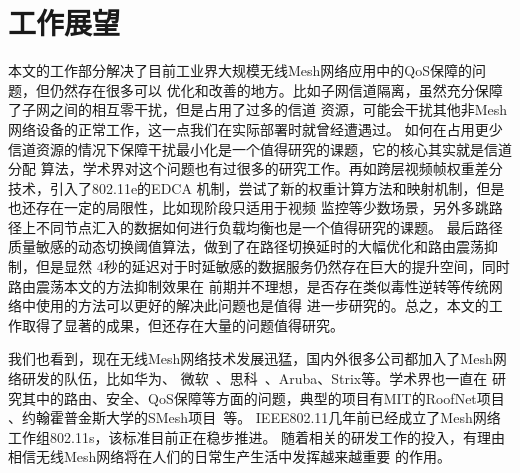 \section{工作展望}
本文的工作部分解决了目前工业界大规模无线Mesh网络应用中的QoS保障的问题，但仍然存在很多可以
优化和改善的地方。比如子网信道隔离，虽然充分保障了子网之间的相互零干扰，但是占用了过多的信道
资源，可能会干扰其他非Mesh网络设备的正常工作，这一点我们在实际部署时就曾经遭遇过。
如何在占用更少信道资源的情况下保障干扰最小化是一个值得研究的课题，它的核心其实就是信道分配
算法，学术界对这个问题也有过很多的研究工作。再如跨层视频帧权重差分技术，引入了802.11e的EDCA
机制，尝试了新的权重计算方法和映射机制，但是也还存在一定的局限性，比如现阶段只适用于视频
监控等少数场景，另外多跳路径上不同节点汇入的数据如何进行负载均衡也是一个值得研究的课题。
最后路径质量敏感的动态切换阈值算法，做到了在路径切换延时的大幅优化和路由震荡抑制，但是显然
4秒的延迟对于时延敏感的数据服务仍然存在巨大的提升空间，同时路由震荡本文的方法抑制效果在
前期并不理想，是否存在类似毒性逆转等传统网络中使用的方法可以更好的解决此问题也是值得
进一步研究的。总之，本文的工作取得了显著的成果，但还存在大量的问题值得研究。

我们也看到，现在无线Mesh网络技术发展迅猛，国内外很多公司都加入了Mesh网络研发的队伍，比如华为、
微软~\cite{microsoft}、思科~\cite{cisco}、Aruba、Strix等。学术界也一直在
研究其中的路由、安全、QoS保障等方面的问题，典型的项目有MIT的RoofNet项目~\cite{roofnet}
、约翰霍普金斯大学的SMesh项目~\cite{SMesh}等。
IEEE802.11几年前已经成立了Mesh网络工作组802.11s，该标准目前正在稳步推进。
随着相关的研发工作的投入，有理由相信无线Mesh网络将在人们的日常生产生活中发挥越来越重要
的作用。

